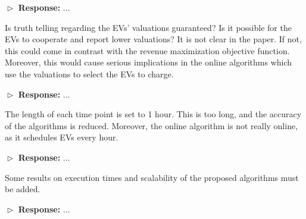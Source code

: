 \documentclass[11pt]{article}
\begin{document}
$\vartriangleright$ \noindent\textbf{Response:} 
...

\vspace{3mm}
{\color{blue} Is truth telling regarding the EVs’ valuations guaranteed? Is it possible for the EVs to cooperate and report lower valuations? It is not clear in the paper. If not, this could come in contrast with the revenue maximization objective function. Moreover, this would cause serious implications in the online algorithms which use the valuations to select the EVs to charge.     }
\vspace{3mm}

$\vartriangleright$ \noindent\textbf{Response:} 
...

\vspace{3mm}
{\color{blue} The length of each time point is set to 1 hour. This is too long, and the accuracy of the algorithms is reduced. Moreover, the online algorithm is not really online, as it schedules EVs every hour. }
\vspace{3mm}

$\vartriangleright$ \noindent\textbf{Response:} 
...

\vspace{3mm}
{\color{blue} Some results on execution times and scalability of the proposed algorithms must be added.
 }
\vspace{3mm}

$\vartriangleright$ \noindent\textbf{Response:} 
...

%
\end{document}
